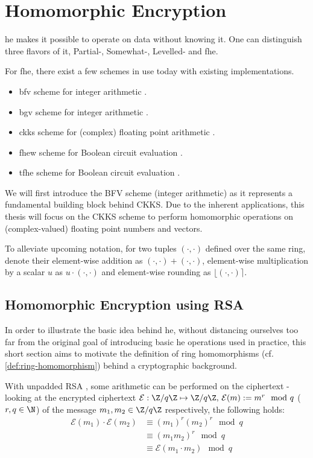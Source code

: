\chapter{Homomorphic Encryption}
\label{chap:homomorphic-encryption}

\gls{he} makes it possible to operate on data without knowing it.
One can distinguish three flavors of it, Partial-, Somewhat-, Levelled- and \gls{fhe}.

For \Gls{fhe}, there exist a few schemes in use today with existing implementations.
\begin{itemize}
  \item \gls{bfv} scheme for integer arithmetic \parencite{2012-fv-original, 2012-brakerski}.
  \item \gls{bgv} scheme for integer arithmetic \parencite{2012-bgv-original}.
  \item \gls{ckks} scheme for (complex) floating point arithmetic \parencite{2017-ckks-original}.
  \item \gls{fhew} scheme for Boolean circuit evaluation \parencite{2015-fhew-original}.
  \item \gls{tfhe} scheme for Boolean circuit evaluation \parencite{2019-tfhe-original}.
\end{itemize}

We will first introduce the BFV scheme (integer arithmetic) as it represents a fundamental building block behind CKKS.
Due to the inherent applications, this thesis will focus on the CKKS scheme to perform homomorphic operations on (complex-valued) floating point numbers and vectors.

To alleviate upcoming notation, for two tuples $(\cdot, \cdot)$ defined over the same ring, denote their element-wise addition as $(\cdot, \cdot) + (\cdot, \cdot)$, element-wise multiplication by a scalar $u$ as $u \cdot (\cdot, \cdot)$ and element-wise rounding as $\lfloor (\cdot, \cdot) \rceil$.

\section{Homomorphic Encryption using RSA}
In order to illustrate the basic idea behind \Gls{he}, without distancing ourselves too far from the original goal of introducing basic \gls{he} operations used in practice, this short section aims to motivate the definition of ring homomorphisms (cf. \cref{def:ring-homomorphism}) behind a cryptographic background.

With unpadded RSA \parencite{1983-rsa}, some arithmetic can be performed on the ciphertext - looking at the encrypted ciphertext $\mathcal{E}: \Z/q\Z \mapsto \Z/q\Z,\, \mathcal{E}(m) := m^r \mod q$ ($r, q \in \N$) of the message $m_1, m_2 \in \Z/q\Z$ respectively, the following holds:
\begin{align*}
  \mathcal{E}(m_1) \cdot \mathcal{E}(m_2)
   & \equiv (m_1)^r (m_2)^r \mod q            \\
   & \equiv (m_1 m_2)^r \mod q                \\
   & \equiv \mathcal{E}(m_1 \cdot m_2) \mod q
\end{align*}

